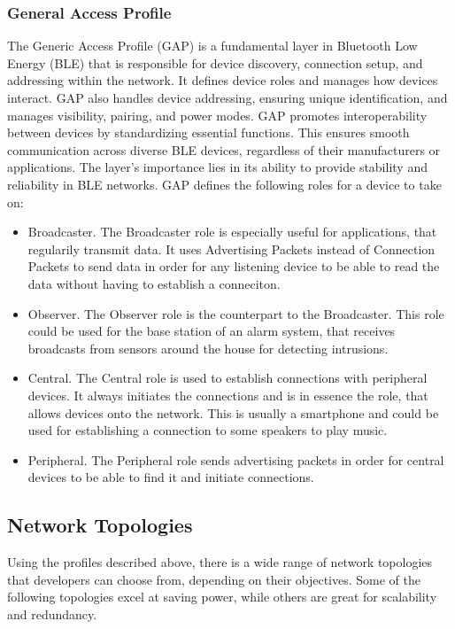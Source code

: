 \subsubsection{General Access Profile}
The Generic Access Profile (GAP) is a fundamental layer in Bluetooth Low Energy (BLE) that is responsible for device discovery, connection setup, and addressing within the network. It defines device roles and manages how devices interact. GAP also handles device addressing, ensuring unique identification, and manages visibility, pairing, and power modes. GAP promotes interoperability between devices by standardizing essential functions. 
This ensures smooth communication across diverse BLE devices, regardless of their manufacturers or applications. The layer's importance lies in its ability to provide stability and reliability in BLE networks. GAP defines the following roles for a device to take on: 
\begin{itemize}
    \item{Broadcaster. The Broadcaster role is especially useful for applications, that regularily transmit data. It uses Advertising Packets instead of Connection Packets to send data in order for any listening device to be able to read the data without having to establish a conneciton.}
    \item{Observer. The Observer role is the counterpart to the Broadcaster. This role could be used for the base station of an alarm system, that receives broadcasts from sensors around the house for detecting intrusions.}
    \item{Central. The Central role is used to establish connections with peripheral devices. It always initiates the connections and is in essence the role, that allows devices onto the network. This is usually a smartphone and could be used for establishing a connection to some speakers to play music.}
    \item{Peripheral. The Peripheral role sends advertising packets in order for central devices to be able to find it and initiate connections.}
\end{itemize}

\subsection{Network Topologies}
Using the profiles described above, there is a wide range of network topologies that developers can choose from, depending on their objectives.
Some of the following topologies excel at saving power, while others are great for scalability and redundancy.

